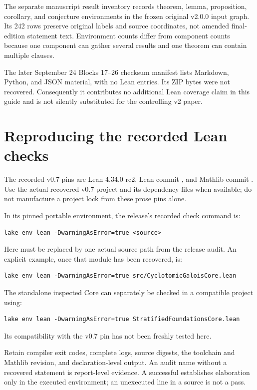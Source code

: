 \documentclass[11pt]{article}
\begin{document}
The separate manuscript result inventory records theorem, lemma,
proposition, corollary, and conjecture environments in the frozen original
v2.0.0 input graph. Its 242 rows preserve original labels and source coordinates,
not amended final-edition statement text. Environment
counts differ from component counts because one component can gather
several results and one theorem can contain multiple clauses.

The later September 24 Blocks 17--26 checksum manifest lists Markdown,
Python, and JSON material, with no Lean entries. Its ZIP bytes were not
recovered. Consequently it contributes no additional Lean coverage claim
in this guide and is not silently substituted for the controlling v2 paper.

\section{Reproducing the recorded Lean checks}
The recorded v0.7 pins are Lean 4.34.0-rc2, Lean commit
\texttt{}, and Mathlib commit
\texttt{}. Use the actual recovered
v0.7 project and its dependency files when available; do not manufacture a
project lock from these prose pins alone.

In its pinned portable environment, the release's recorded check command is:
\begin{lstlisting}
lake env lean -DwarningAsError=true <source>
\end{lstlisting}
Here \texttt{} must be replaced by one actual source path from the
release audit. An explicit example, once that module has been recovered, is:
\begin{lstlisting}
lake env lean -DwarningAsError=true src/CyclotomicGaloisCore.lean
\end{lstlisting}
The standalone inspected Core can separately be checked in a compatible
project using:
\begin{lstlisting}
lake env lean -DwarningAsError=true StratifiedFoundationsCore.lean
\end{lstlisting}
Its compatibility with the v0.7 pin has not been freshly tested here.

Retain compiler exit codes, complete logs, source digests, the toolchain and
Mathlib revision, and declaration-level \texttt{} output.
An audit name without a recovered statement is report-level evidence.
A successful \texttt{} establishes elaboration only in the executed
environment; an unexecuted \texttt{} line in a source is not a pass.
\end{document}
